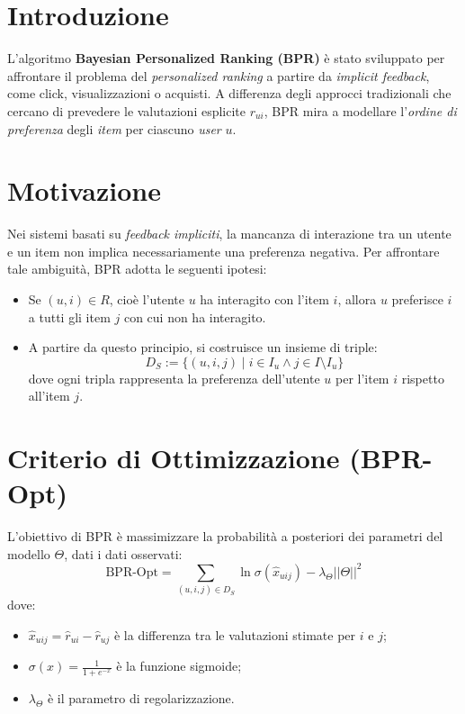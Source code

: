 \documentclass{article}
\begin{document}
\section{Introduzione}

L'algoritmo \textbf{Bayesian Personalized Ranking (BPR)} è stato sviluppato per affrontare il problema del \textit{personalized ranking} a partire da \textit{implicit feedback}, come click, visualizzazioni o acquisti. A differenza degli approcci tradizionali che cercano di prevedere le valutazioni esplicite $r_{ui}$, BPR mira a modellare l'\textit{ordine di preferenza} degli \textit{item} per ciascuno \textit{user} $u$.

\section{Motivazione}

Nei sistemi basati su \textit{feedback impliciti}, la mancanza di interazione tra un utente e un item non implica necessariamente una preferenza negativa. Per affrontare tale ambiguità, BPR adotta le seguenti ipotesi:

\begin{itemize}
    \item Se $(u, i) \in R$, cioè l'utente $u$ ha interagito con l'item $i$, allora $u$ preferisce $i$ a tutti gli item $j$ con cui non ha interagito.
    \item A partire da questo principio, si costruisce un insieme di triple:
    \[
    D_S := \{(u, i, j) \mid i \in I_u \wedge j \in I \setminus I_u\}
    \]
    dove ogni tripla rappresenta la preferenza dell'utente $u$ per l'item $i$ rispetto all'item $j$.
\end{itemize}

\section{Criterio di Ottimizzazione (BPR-Opt)}

L'obiettivo di BPR è massimizzare la probabilità a posteriori dei parametri del modello $\Theta$, dati i dati osservati:
\[
\text{BPR-Opt} = \sum_{(u, i, j) \in D_S} \ln \sigma(\hat{x}_{uij}) - \lambda_\Theta ||\Theta||^2
\]
dove:
\begin{itemize}
    \item $\hat{x}_{uij} = \hat{r}_{ui} - \hat{r}_{uj}$ è la differenza tra le valutazioni stimate per $i$ e $j$;
    \item $\sigma(x) = \frac{1}{1 + e^{-x}}$ è la funzione sigmoide;
    \item $\lambda_\Theta$ è il parametro di regolarizzazione.
\end{itemize}
\end{document}
